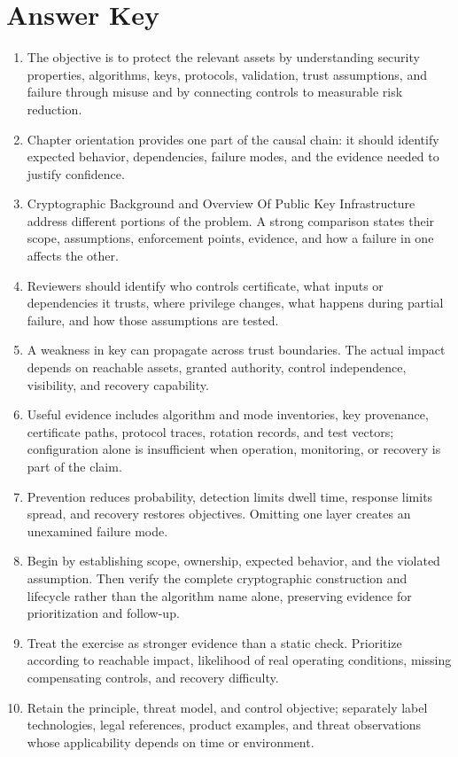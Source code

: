 \documentclass[11pt]{article}
\begin{document}
\section*{Answer Key}
\begin{enumerate}
\item The objective is to protect the relevant assets by understanding security properties, algorithms, keys, protocols, validation, trust assumptions, and failure through misuse and by connecting controls to measurable risk reduction.
\item Chapter orientation provides one part of the causal chain: it should identify expected behavior, dependencies, failure modes, and the evidence needed to justify confidence.
\item Cryptographic Background and Overview Of Public Key Infrastructure address different portions of the problem. A strong comparison states their scope, assumptions, enforcement points, evidence, and how a failure in one affects the other.
\item Reviewers should identify who controls certificate, what inputs or dependencies it trusts, where privilege changes, what happens during partial failure, and how those assumptions are tested.
\item A weakness in key can propagate across trust boundaries. The actual impact depends on reachable assets, granted authority, control independence, visibility, and recovery capability.
\item Useful evidence includes algorithm and mode inventories, key provenance, certificate paths, protocol traces, rotation records, and test vectors; configuration alone is insufficient when operation, monitoring, or recovery is part of the claim.
\item Prevention reduces probability, detection limits dwell time, response limits spread, and recovery restores objectives. Omitting one layer creates an unexamined failure mode.
\item Begin by establishing scope, ownership, expected behavior, and the violated assumption. Then verify the complete cryptographic construction and lifecycle rather than the algorithm name alone, preserving evidence for prioritization and follow-up.
\item Treat the exercise as stronger evidence than a static check. Prioritize according to reachable impact, likelihood of real operating conditions, missing compensating controls, and recovery difficulty.
\item Retain the principle, threat model, and control objective; separately label technologies, legal references, product examples, and threat observations whose applicability depends on time or environment.
\end{enumerate}
\end{document}
